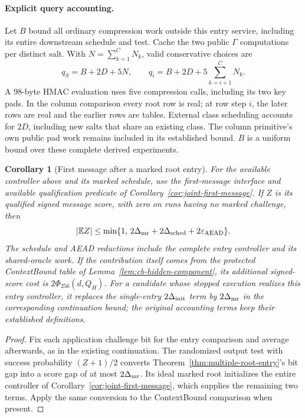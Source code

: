 \documentclass[pdflatex]{sn-jnl}
\theoremstyle{thmstyleone}
\newtheorem{corollary}[theorem]{Corollary}
\theoremstyle{thmstylethree}
\theoremstyle{thmstyletwo}
\begin{document}
\paragraph{Explicit query accounting.}
Let $B$ bound all ordinary compression work outside this entry service,
including its entire downstream schedule and test. Cache the two public
$\Gamma$ computations per distinct salt. With
$N=\sum_{k=1}^{C}N_k$, valid conservative choices are
\begin{equation}
 q_S=B+2D+5N,\qquad
 q_i=B+2D+5\sum_{k=i+1}^{C}N_k.
 \label{eq:multiple-root-budgets}
\end{equation}
A 98-byte HMAC evaluation uses five compression calls, including its two key
pads. In the column comparison every root row is real; at row step $i$, the
later rows are real and the earlier rows are tables. External class scheduling
accounts for $2D$, including new salts that share an existing class. The
column primitive's own public pad work remains included in its established
bound. $B$ is a uniform bound over these complete derived experiments.

\begin{corollary}[First message after a marked root entry]
\label{cor:multiple-root-message}
For the available controller above and its marked schedule, use the
first-message interface and available qualification predicate of Corollary~\ref{cor:joint-first-message}. If $Z$
is its qualified signed message score, with zero on runs having no marked
challenge, then
\begin{equation}
 |\mathbb E Z|\le
 \min\{1,\,2\Delta_{\rm mr}+2\Delta_{\rm sched}
                      +2\varepsilon_{\rm AEAD}\}.
 \label{eq:multiple-root-message}
\end{equation}
The schedule and AEAD reductions include the complete entry controller and
its shared-oracle work. If the contribution itself comes from the protected
ContextBound table of Lemma~\ref{lem:cb-hidden-component}, its additional
signed-score cost is $2\Phi_{256}(d,Q_H)$. For a candidate whose stopped execution realizes this entry controller,
it replaces the single-entry $2\Delta_{\rm init}$ term by
$2\Delta_{\rm mr}$ in the corresponding continuation bound; the original accounting terms keep their
established definitions.
\end{corollary}
\begin{proof}
Fix each application challenge bit for the entry comparison and average
afterwards, as in the existing continuation. The randomized output test
with success probability $(Z+1)/2$ converts
Theorem~\ref{thm:multiple-root-entry}'s bit gap into a score gap of at most
$2\Delta_{\rm mr}$. Its ideal marked root initializes the entire controller
of Corollary~\ref{cor:joint-first-message}, which supplies the remaining two
terms. Apply the same conversion to the ContextBound comparison when present.
\end{proof}
\end{document}
